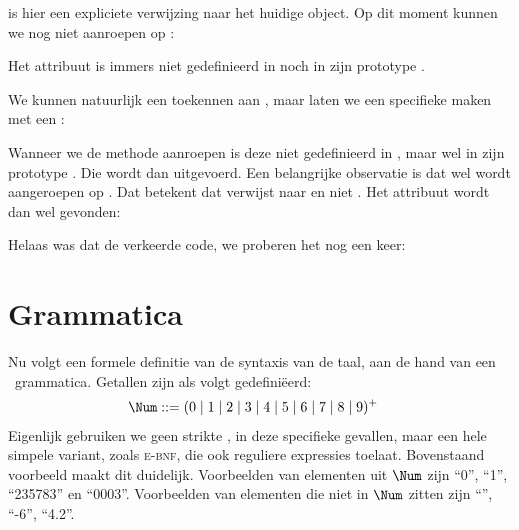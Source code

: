 
 is hier een expliciete verwijzing naar het huidige object. Op dit moment kunnen we  nog niet aanroepen op :


Het attribuut  is immers niet gedefinieerd in  noch in zijn prototype .

We kunnen natuurlijk een  toekennen aan , maar laten we een specifieke  maken met een :


Wanneer we de methode  aanroepen is deze niet gedefinieerd in , maar wel in zijn prototype . Die wordt dan uitgevoerd. Een belangrijke observatie is dat  wel wordt aangeroepen op . Dat betekent dat  verwijst naar  en niet . Het attribuut  wordt dan wel gevonden:


Helaas was dat de verkeerde code, we proberen het nog een keer:



\section{Grammatica}

Nu volgt een formele definitie van de syntaxis van de taal, aan de hand van een \BNF\ grammatica. Getallen zijn als volgt gedefiniëerd:
%
\begin{align*}
  \Num \GrammarDef (0 \mid 1 \mid 2 \mid 3 \mid 4 \mid 5 \mid 6 \mid 7 \mid 8 \mid 9)^+
\end{align*}
%
Eigenlijk gebruiken we geen strikte \BNF, in deze specifieke gevallen, maar een hele simpele variant, zoals \textsc{e-bnf}, die ook reguliere expressies toelaat. Bovenstaand voorbeeld maakt dit duidelijk. Voorbeelden van elementen uit $\Num$ zijn ``0'', ``1'', ``235783'' en ``0003''. Voorbeelden van elementen die niet in $\Num$ zitten zijn ``'', ``-6'', ``4.2''.

